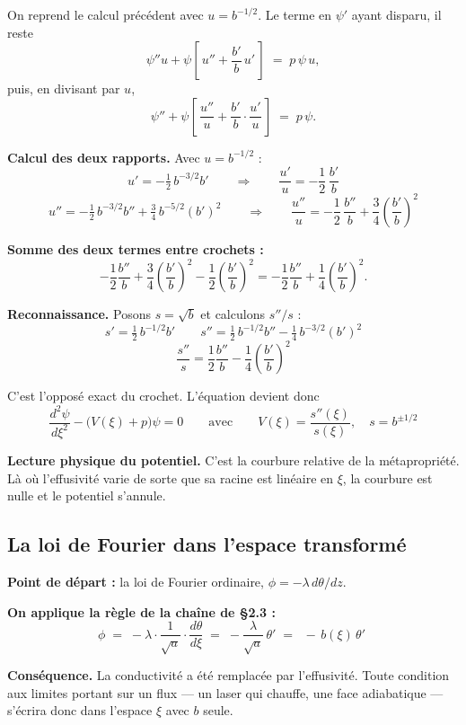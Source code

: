\documentclass[11pt,a4paper]{article}
\begin{document}
On reprend le calcul précédent avec $u = b^{-1/2}$. Le terme en $\psi'$ ayant disparu, il reste
\[ \psi''u + \psi\left[\,u'' + \frac{b'}{b}\,u'\,\right] \;=\; p\,\psi\,u , \]
puis, en divisant par $u$,
\[ \psi'' + \psi\left[\,\frac{u''}{u} + \frac{b'}{b}\cdot\frac{u'}{u}\,\right] \;=\; p\,\psi . \]

\textbf{Calcul des deux rapports.} Avec $u = b^{-1/2}$ :
\[ u' = -\tfrac{1}{2}\,b^{-3/2}b'
\qquad\Longrightarrow\qquad
\frac{u'}{u} = -\frac{1}{2}\,\frac{b'}{b} \]
\[ u'' = -\tfrac{1}{2}\,b^{-3/2}b'' + \tfrac{3}{4}\,b^{-5/2}(b')^{2}
\qquad\Longrightarrow\qquad
\frac{u''}{u} = -\frac{1}{2}\,\frac{b''}{b} + \frac{3}{4}\left(\frac{b'}{b}\right)^{2} \]

\textbf{Somme des deux termes entre crochets :}
\[ -\frac{1}{2}\frac{b''}{b} + \frac{3}{4}\left(\frac{b'}{b}\right)^{2}
- \frac{1}{2}\left(\frac{b'}{b}\right)^{2}
= -\frac{1}{2}\frac{b''}{b} + \frac{1}{4}\left(\frac{b'}{b}\right)^{2} . \]

\textbf{Reconnaissance.} Posons $s = \sqrt{b}$ et calculons $s''/s$ :
\[ s' = \tfrac{1}{2}\,b^{-1/2}b'
\qquad
s'' = \tfrac{1}{2}\,b^{-1/2}b'' - \tfrac{1}{4}\,b^{-3/2}(b')^{2} \]
\[ \frac{s''}{s} = \frac{1}{2}\frac{b''}{b} - \frac{1}{4}\left(\frac{b'}{b}\right)^{2} \]

C'est l'opposé exact du crochet. L'équation devient donc
\[ \boxed{\;\frac{d^{2}\psi}{d\xi^{2}} - \bigl(V(\xi) + p\bigr)\psi = 0
\qquad\text{avec}\qquad
V(\xi) = \frac{s''(\xi)}{s(\xi)},\quad s = b^{\pm 1/2} \;} \]

\textbf{Lecture physique du potentiel.} C'est la courbure relative de la métapropriété. Là où
l'effusivité varie de sorte que sa racine est linéaire en $\xi$, la courbure est nulle et le potentiel
s'annule.

\newpage
\subsection{La loi de Fourier dans l'espace transformé}

\textbf{Point de départ :} la loi de Fourier ordinaire, $\phi = -\lambda\, d\theta/dz$.

\textbf{On applique la règle de la chaîne de §2.3 :}
\[ \phi \;=\; -\lambda\cdot\frac{1}{\sqrt{a}}\cdot\frac{d\theta}{d\xi}
\;=\; -\frac{\lambda}{\sqrt{a}}\,\theta'
\;=\; \boxed{\;-\,b(\xi)\,\theta'\;} \]

\textbf{Conséquence.} La conductivité a été remplacée par l'effusivité. Toute condition aux limites
portant sur un flux --- un laser qui chauffe, une face adiabatique --- s'écrira donc dans l'espace
$\xi$ avec $b$ seule.
\end{document}
